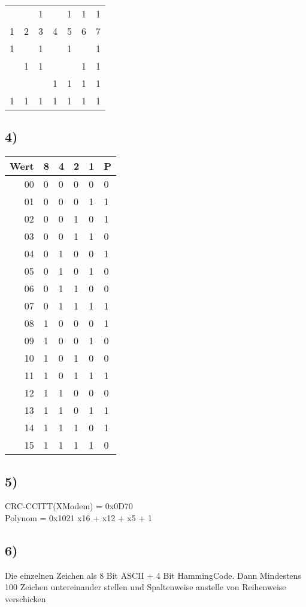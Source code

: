 \documentclass[]{article}
\begin{document}
\begin{longtable}[l]{@{}lllllll@{}}
	\toprule
	 & &1& &1&1&1\\
	1&2&3&4&5&6&7\\
	\endhead
	\midrule
	1& &1& &1& &1\\
	 &1&1& & &1&1\\
	 & & &1&1&1&1\\
	\hline
	1&1&1&1&1&1&1\\
	\bottomrule
\end{longtable}

\pagebreak

\subsection{4)}\label{Aufgabe 5}

\begin{longtable}[l]{@{}r|lllll@{}}
	\toprule
	Wert&8&4&2&1&P\\
	\endhead
	\midrule
	00&0&0&0&0&0\\
	01&0&0&0&1&1\\
	02&0&0&1&0&1\\
	03&0&0&1&1&0\\
	04&0&1&0&0&1\\
	05&0&1&0&1&0\\
	06&0&1&1&0&0\\
	07&0&1&1&1&1\\
	08&1&0&0&0&1\\
	09&1&0&0&1&0\\
	10&1&0&1&0&0\\
	11&1&0&1&1&1\\
	12&1&1&0&0&0\\
	13&1&1&0&1&1\\
	14&1&1&1&0&1\\
	15&1&1&1&1&0\\
	\bottomrule
\end{longtable}

\subsection{5)}\label{5}

CRC-CCITT(XModem) = 0x0D70\\
Polynom = 0x1021 x16 + x12 + x5 + 1

\subsection{6)}\label{6}

Die einzelnen Zeichen als 8 Bit ASCII + 4 Bit HammingCode. Dann Mindestens 100 Zeichen untereinander stellen und Spaltenweise
anstelle von Reihenweise verschicken
\end{document}
